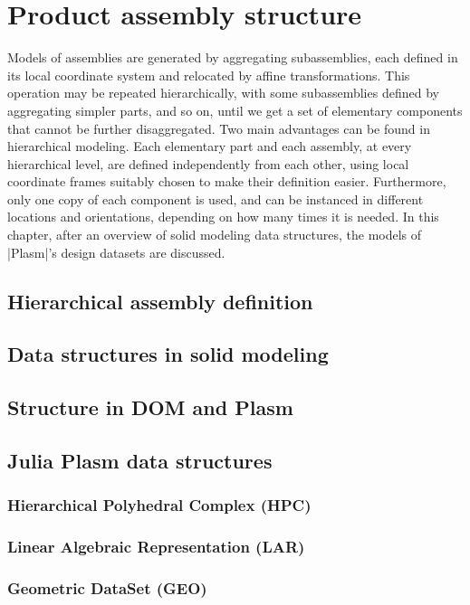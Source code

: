 
\chapter{Product assembly structure}
\label{chapt:6}

Models of assemblies are generated by aggregating subassemblies, each defined in its local coordinate system and relocated by affine transformations. This operation may be repeated hierarchically, with some subassemblies defined by aggregating simpler parts, and so on, until we get a set of elementary components that cannot be further disaggregated.
Two main advantages can be found in hierarchical modeling. Each elementary part and each assembly, at every hierarchical level, are defined independently from each other, using local coordinate frames suitably chosen to make their definition easier. Furthermore, only one copy of each component is used, and can be instanced in different locations and orientations, depending on how many times it is needed. In this chapter, after an overview of solid modeling data structures, the models of |Plasm|’s design datasets are discussed. 


\section{Hierarchical assembly definition}\label{sect:6-1}


\section{Data structures in solid modeling}\label{sect:6-2}


\section{Structure in DOM and Plasm}\label{sect:6-3}


\section{Julia Plasm data structures}\label{sect:6-4}


\subsection{Hierarchical Polyhedral Complex (HPC)}\label{sect:6-4-1}


\subsection{Linear Algebraic Representation (LAR)}\label{sect:6-4-2}


\subsection{Geometric DataSet (GEO)}\label{sect:7-4-3}


